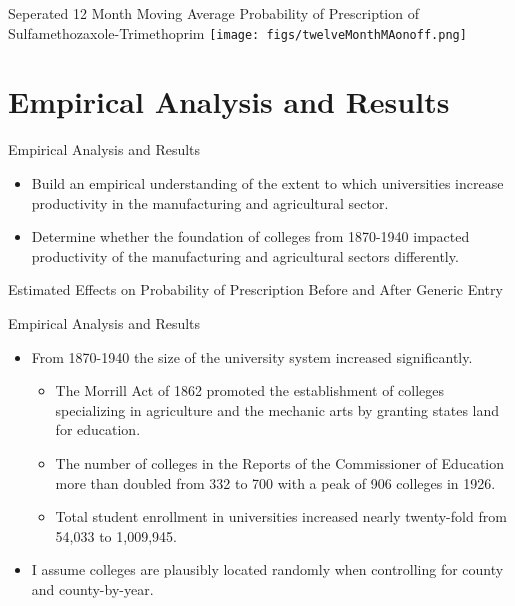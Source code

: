 \documentclass{beamer}
\begin{document}
\begin{frame}{Seperated 12 Month Moving Average Probability of Prescription of Sulfamethozaxole-Trimethoprim}
\texttt{[image: figs/twelveMonthMAonoff.png]}
\end{frame}

\section{Empirical Analysis and Results}
\begin{frame}{Empirical Analysis and Results}
\begin{itemize}
\item Build an empirical understanding of the extent to which  universities increase productivity in the manufacturing and agricultural sector.
\item Determine whether the foundation of colleges from 1870-1940 impacted productivity of the manufacturing and agricultural sectors differently.
\end{itemize}
\end{frame}

\begin{frame}{Estimated Effects on Probability of Prescription Before and After Generic Entry}
\begin{center}
\scalebox{.45}{}
\end{center}
\end{frame}

\begin{frame}{Empirical Analysis and Results}
\begin{itemize}
\item From 1870-1940 the size of the university system increased significantly. 
\begin{itemize}
\item The Morrill Act of 1862 promoted the establishment of colleges specializing in agriculture and the mechanic arts by granting states land for education. 
\item The number of colleges in the Reports of the Commissioner of Education more than doubled from 332 to 700 with a peak of 906 colleges in 1926.
\item Total student enrollment in universities increased nearly twenty-fold from 54,033 to 1,009,945.
\end{itemize}
\item I assume colleges are plausibly located randomly when controlling for county and county-by-year.
\end{itemize}
\end{frame}
\end{document}
